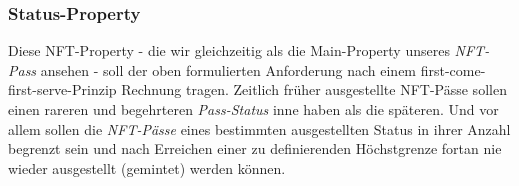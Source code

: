 
\subsubsection{Status-Property}

\vspace{0.2cm}

Diese NFT-Property - die wir gleichzeitig als die Main-Property unseres \textit{NFT-Pass} ansehen - soll der oben formulierten Anforderung nach einem first-come-first-serve-Prinzip Rechnung tragen. Zeitlich früher ausgestellte NFT-Pässe sollen einen rareren und begehrteren \textit{Pass-Status} inne haben als die späteren. Und vor allem sollen die \textit{NFT-Pässe} eines bestimmten ausgestellten Status in ihrer Anzahl begrenzt sein und nach Erreichen einer zu definierenden Höchstgrenze fortan nie wieder ausgestellt (ge\-mintet) werden können.

\vspace{0.3cm}

